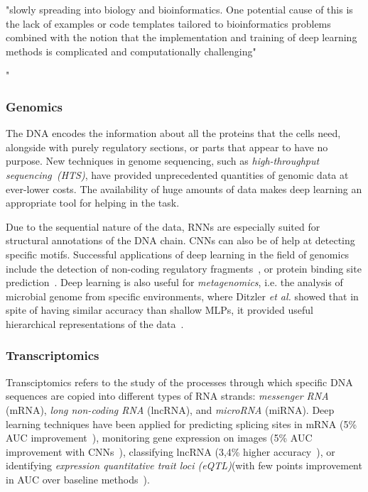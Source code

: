 "slowly spreading into biology and bioinformatics. One potential cause of this is the lack of examples or code templates tailored to bioinformatics problems combined with the notion that the implementation and training of deep learning methods is complicated and computationally challenging" \cite{Jurtz2017}

"
\subsubsection{Genomics}
The DNA encodes the information about all the proteins that the cells need, alongside with purely regulatory sections, or parts that appear to have no purpose. New techniques in genome sequencing, such as \textit{high-throughput sequencing~(HTS)}, have provided unprecedented quantities of genomic data at ever-lower costs. The availability of huge amounts of data makes deep learning an appropriate tool for helping in the task.

Due to the sequential nature of the data, RNNs are especially suited for structural annotations of the DNA chain. CNNs can also be of help at detecting specific motifs. Successful applications of deep learning in the field of genomics include the detection of non-coding regulatory fragments~\cite{Zhou2015}, or protein binding site prediction~\cite{Alipanahi2015}. Deep learning is also useful for \textit{metagenomics}, i.e. the analysis of microbial genome from specific environments, where Ditzler \textit{et al.} showed that in spite of having similar accuracy than shallow MLPs, it provided useful hierarchical representations of the data~\cite{Ditzler2015}.

\subsubsection{Transcriptomics}
Transciptomics refers to the study of the processes through which specific DNA sequences are copied into different types of RNA strands: \textit{messenger RNA} (mRNA), \textit{long non-coding RNA} (lncRNA), and \textit{microRNA} (miRNA). Deep learning techniques have been applied for predicting splicing sites in mRNA (5\% AUC improvement~\cite{Leung2014}), monitoring gene expression on images (5\% AUC improvement with CNNs~\cite{Zeng2015}), classifying lncRNA (3,4\% higher accuracy~\cite{Fan2015}), or identifying \textit{expression quantitative trait loci (eQTL)}(with few points improvement in AUC over baseline methods~\cite{Witteveen2014}).

